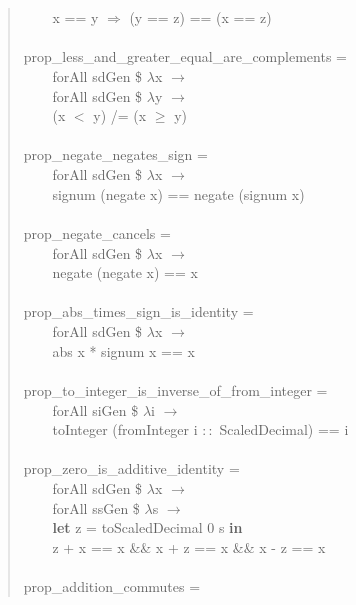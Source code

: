 \documentclass[prodmode,acmtoplas]{acmsmall}
\begin{document}
\begin{quote}
\begin{tabbing}
\verb|    |\sffamily    x == y $\Longrightarrow$ (y == z) == (x == z)\\
\\
\sffamily prop\_less\_and\_greater\_equal\_are\_complements =\\
\verb|    |\sffamily    forAll sdGen \$ $\lambda$x $\rightarrow$\\
\verb|    |\sffamily    forAll sdGen \$ $\lambda$y $\rightarrow$\\
\verb|    |\sffamily    (x $<$ y) /= (x $\ge$ y)\\
\\
\sffamily prop\_negate\_negates\_sign =\\
\verb|    |\sffamily    forAll sdGen \$ $\lambda$x $\rightarrow$\\
\verb|    |\sffamily    signum (negate x) == negate (signum x)\\
\\
\sffamily prop\_negate\_cancels =\\
\verb|    |\sffamily    forAll sdGen \$ $\lambda$x $\rightarrow$\\
\verb|    |\sffamily    negate (negate x) == x\\
\\
\sffamily prop\_abs\_times\_sign\_is\_identity =\\
\verb|    |\sffamily    forAll sdGen \$ $\lambda$x $\rightarrow$\\
\verb|    |\sffamily    abs x * signum x == x\\
\\
\sffamily prop\_to\_integer\_is\_inverse\_of\_from\_integer =\\
\verb|    |\sffamily    forAll siGen \$ $\lambda$i $\rightarrow$\\
\verb|    |\sffamily    toInteger (fromInteger i $::$ ScaledDecimal) == i\\
\\
\sffamily prop\_zero\_is\_additive\_identity =\\
\verb|    |\sffamily    forAll sdGen \$ $\lambda$x $\rightarrow$\\
\verb|    |\sffamily    forAll ssGen \$ $\lambda$s $\rightarrow$\\
\verb|    |\sffamily    \textbf{let} z = toScaledDecimal 0 s \textbf{in}\\
\verb|    |\sffamily    z + x == x \&\& x + z == x \&\& x - z == x\\
\\
\sffamily prop\_addition\_commutes =\\

\end{tabbing}
\end{quote}
\end{document}

